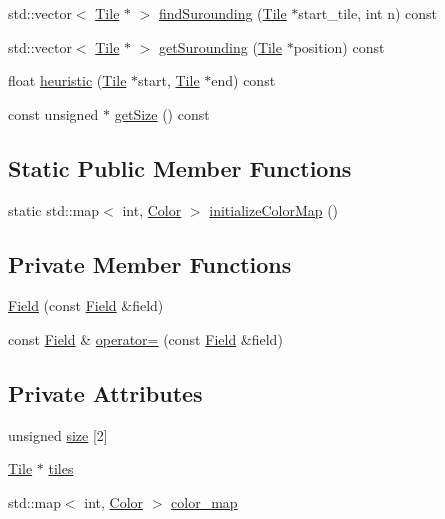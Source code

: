 \begin{DoxyCompactItemize}
\item 
std\+::vector$<$ \hyperlink{classTile}{Tile} $\ast$ $>$ \hyperlink{classField_a7bc17bb858f3707e156d1fb6e32a4196}{find\+Surounding} (\hyperlink{classTile}{Tile} $\ast$start\+\_\+tile, int n) const
\item 
std\+::vector$<$ \hyperlink{classTile}{Tile} $\ast$ $>$ \hyperlink{classField_a36a2c3f822ece390f7b69f528d1d8742}{get\+Surounding} (\hyperlink{classTile}{Tile} $\ast$position) const
\item 
float \hyperlink{classField_a1b07030b79bb1e68dbf82aff2bd45730}{heuristic} (\hyperlink{classTile}{Tile} $\ast$start, \hyperlink{classTile}{Tile} $\ast$end) const
\item 
const unsigned $\ast$ \hyperlink{classField_a6daa65acbf49cc9c9516eca76efeaec2}{get\+Size} () const
\end{DoxyCompactItemize}
\subsection*{Static Public Member Functions}
\begin{DoxyCompactItemize}
\item 
static std\+::map$<$ int, \hyperlink{structColor}{Color} $>$ \hyperlink{classField_aeb9f68e86153bfefe2191149fdd840ed}{initialize\+Color\+Map} ()
\end{DoxyCompactItemize}
\subsection*{Private Member Functions}
\begin{DoxyCompactItemize}
\item 
\hyperlink{classField_a72ebbf8a9843cfd7844aa76698ea1541}{Field} (const \hyperlink{classField}{Field} \&field)
\item 
const \hyperlink{classField}{Field} \& \hyperlink{classField_a13d788c1c3d6bba97f3b8d3b6582a814}{operator=} (const \hyperlink{classField}{Field} \&field)
\end{DoxyCompactItemize}
\subsection*{Private Attributes}
\begin{DoxyCompactItemize}
\item 
unsigned \hyperlink{classField_acc2b9f1374f0dbb02f10aaae82762241}{size} \mbox{[}2\mbox{]}
\item 
\hyperlink{classTile}{Tile} $\ast$ \hyperlink{classField_afe68ecac3a63285a2514e6b550b2277c}{tiles}
\item 
std\+::map$<$ int, \hyperlink{structColor}{Color} $>$ \hyperlink{classField_a105993998155a8564b883748b65dddb4}{color\+\_\+map}
\end{DoxyCompactItemize}


